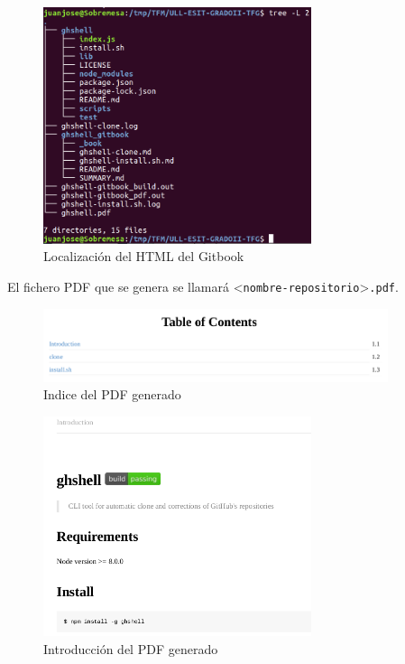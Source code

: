 		\begin{figure}[H]
		\begin{center}
		\includegraphics[width=0.7\textwidth]{images/ghshell8-4}
		\caption{Localización del HTML del Gitbook}
		\label{fig:ghshell8-4}
		\end{center}
		\end{figure}
		
		
		El fichero PDF que se genera se llamará \textless \verb|nombre-repositorio|\textgreater \verb|.pdf|. 
        		
        
        \begin{figure}[H]
		\begin{center}
		\includegraphics[width=0.9\textwidth]{images/ghshell8-6}
		\caption{Indice del PDF generado}
		\label{fig:ghshell8-6}
		\end{center}
		\end{figure}
		
		\begin{figure}[H]
		\begin{center}
		\includegraphics[width=0.7\textwidth]{images/ghshell8-7}
		\caption{Introducción del PDF generado}
		\label{fig:ghshell8-7}
		\end{center}
		\end{figure}
		
